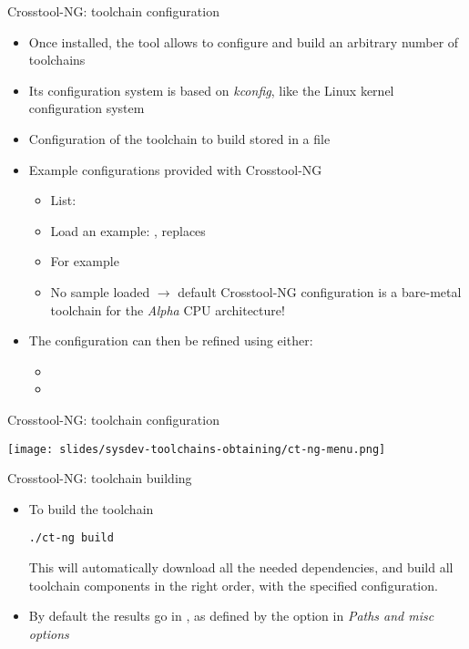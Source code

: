 \begin{frame}{Crosstool-NG: toolchain configuration}
  \begin{itemize}
  \item Once installed, the  tool allows to configure and
    build an arbitrary number of toolchains
  \item Its configuration system is based on {\em kconfig}, like the
    Linux kernel configuration system
  \item Configuration of the toolchain to build stored in a
     file
  \item Example configurations provided with Crosstool-NG
    \begin{itemize}
    \item List: 
    \item Load an example: , replaces 
    \item For example 
    \item No sample loaded
      $\rightarrow$ default Crosstool-NG configuration is a bare-metal
      toolchain for the {\em Alpha} CPU architecture!
    \end{itemize}
  \item The configuration can then be refined using either:
    \begin{itemize}
    \item {}
    \item {}
    \end{itemize}
  \end{itemize}
\end{frame}

\begin{frame}{Crosstool-NG: toolchain configuration}
  \begin{center}
    \texttt{[image: slides/sysdev-toolchains-obtaining/ct-ng-menu.png]}
    \vspace{0.1cm}\\
  \end{center}
\end{frame}

\begin{frame}[fragile]{Crosstool-NG: toolchain building}
  \begin{itemize}
  \item To build the toolchain
\begin{verbatim}
./ct-ng build
\end{verbatim}
    This will automatically download all the needed dependencies, and
    build all toolchain components in the right order, with the
    specified configuration.
  \item By default the results go in
    , as defined by the
    option  in {\em Paths and misc options}
  \end{itemize}
\end{frame}

